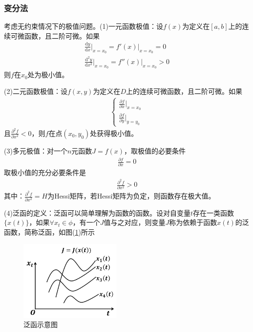         \subsubsection{变分法}
            \par
            考虑无约束情况下的极值问题。(1)一元函数极值：设$f(x)$为定义在$[a,b]$上的连续可微函数，且二阶可微。如果
            \begin{align*}
            \frac{\mathrm{d}y}{\mathrm{d}x}\Big|_{x=x_0} = f'(x)|_{x=x_0} = 0\\
            \frac{\mathrm{d}^2y}{\mathrm{d}x^2}\Big|_{x=x_0} = f''(x)|_{x=x_0} > 0
            \end{align*}
            则$f$在$x_0$处为极小值。
            \par
            (2)二元函数极值：设$f(x,y)$为定义在$D$上的连续可微函数，且二阶可微。如果
            \begin{align*}
            \left\{
            \begin{aligned}
            \frac{\partial f}{\partial x} \Big|_{x = x_0}\\
            \frac{\partial f}{\partial y} \Big|_{y = y_0}
            \end{aligned}
            \right.
            \end{align*}
            且$\frac{\partial ^2f}{\partial x^2}<0$，则$f$在点$(x_0,y_0)$处获得极小值。
            \par
            (3)多元极值：对一个$n$元函数$J = f(x)$，取极值的必要条件
            \begin{align*}
            \frac{\partial f}{\partial x} = 0
            \end{align*}
            取极小值的充分必要条件是
            \begin{align*}
            \frac{\partial ^2f}{\partial x^2} > 0
            \end{align*}
            其中：$\frac{\partial ^2f}{\partial x^2} = H$为Hessi矩阵，若Hessi矩阵为负定，则函数存在极大值。
            \par
            (4)泛函的定义：泛函可以简单理解为函数的函数。设对自变量$t$存在一类函数$\{x(t)\}$，如果$\forall x_t\in \phi $，有一个$J$值与之对应，则变量$J$称为依赖于函数$x(t)$的泛函数，简称泛函，如图(\ref{fig:泛函示意图})所示
            \begin{figure}[H]
            \centering
            \includegraphics[height=4cm]{images/Functional_diagram.jpg}
            \caption{泛函示意图}
            \label{fig:泛函示意图}
            \end{figure}
